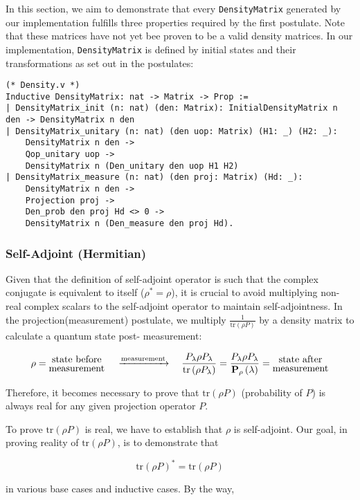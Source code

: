 \documentclass[10pt,a4paper]{article}
\newcommand{\<}{\langle}
\renewcommand{\>}{\rangle}
\newcommand{\prths}[1]{\left( #1 \right)}
\newcommand{\tr}[1]{\textrm{tr} \left( #1 \right)}
\begin{document}
In this section, we aim to demonstrate that every \texttt{DensityMatrix} generated by our
implementation fulfills three properties required by the first postulate. Note that
these matrices have not yet bee proven to be a valid density matrices. In our
implementation, \texttt{DensityMatrix} is defined by initial states and their
transformations as set out in the postulates:

\begin{lstlisting}
(* Density.v *)
Inductive DensityMatrix: nat -> Matrix -> Prop :=
| DensityMatrix_init (n: nat) (den: Matrix): InitialDensityMatrix n den -> DensityMatrix n den
| DensityMatrix_unitary (n: nat) (den uop: Matrix) (H1: _) (H2: _):
    DensityMatrix n den ->
    Qop_unitary uop ->
    DensityMatrix n (Den_unitary den uop H1 H2)
| DensityMatrix_measure (n: nat) (den proj: Matrix) (Hd: _):
    DensityMatrix n den ->
    Projection proj ->
    Den_prob den proj Hd <> 0 ->
    DensityMatrix n (Den_measure den proj Hd).
\end{lstlisting}

\subsubsection{Self-Adjoint (Hermitian)}

Given that the definition of self-adjoint operator is such that the complex conjugate is
equivalent to itself ($\rho^* = \rho$), it is crucial to avoid multiplying non-real
complex scalars to the self-adjoint operator to maintain self-adjointness.
In the projection(measurement) postulate, we multiply $\frac{1}{\tr{\rho
P}}$ by a density matrix to calculate a quantum state post- measurement:

$$
\rho = \stackanchor{\textrm{state before}}{\textrm{measurement}}
\quad \, \xrightarrow{\textrm{measurement}} \quad
\frac{P_\lambda \rho P_\lambda}{\tr{\rho P_\lambda}}
= \frac{P_\lambda \rho P_\lambda}{\textbf{P}_\rho \prths{\lambda}}
= \stackanchor{\textrm{state after}}{\textrm{measurement}}
$$

Therefore, it becomes necessary to prove that $\tr{\rho P}$ (probability of $P$)
is always real for any given projection operator $P$.


To prove $\tr{\rho P}$ is real, we have to establish
that $\rho$ is self-adjoint. Our goal, in proving reality of $\tr{\rho
P}$, is to demonstrate that

$$
\tr{\rho P}^* = \tr{\rho P}
$$

in various base cases and inductive cases. By the way,
\end{document}
